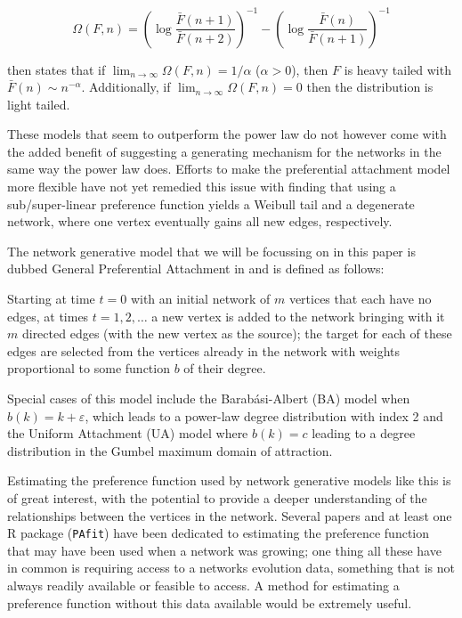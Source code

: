 \documentclass[
  sn-basic,
]{sn-jnl}
\theoremstyle{plain}
\theoremstyle{remark}
\begin{document}
\[
\Omega(F,n) = \left(\log\displaystyle\frac{\bar F (n+1)}{\bar F (n+2)}\right)^{-1} - \left(\log\displaystyle\frac{\bar F (n)}{\bar F (n+1)}\right)^{-1}
\]

\citep{shimura12} then states that if
\(\lim_{n\rightarrow\infty} \Omega(F,n) = 1/\alpha\) (\(\alpha>0\)),
then \(F\) is heavy tailed with \(\bar F(n) \sim n^{-\alpha}\).
Additionally, if \(\lim_{n\rightarrow\infty} \Omega(F,n) = 0\) then the
distribution is light tailed.

These models that seem to outperform the power law do not however come
with the added benefit of suggesting a generating mechanism for the
networks in the same way the power law does. Efforts to make the
preferential attachment model more flexible have not yet remedied this
issue with \citep{krapivsky01} finding that using a sub/super-linear
preference function yields a Weibull tail and a degenerate network,
where one vertex eventually gains all new edges, respectively.

The network generative model that we will be focussing on in this paper
is dubbed General Preferential Attachment in \citep{rudas07} and is
defined as follows:

Starting at time \(t=0\) with an initial network of \(m\) vertices that
each have no edges, at times \(t=1,2,\ldots\) a new vertex is added to
the network bringing with it \(m\) directed edges (with the new vertex
as the source); the target for each of these edges are selected from the
vertices already in the network with weights proportional to some
function \(b\) of their degree.

Special cases of this model include the Barabási-Albert (BA) model when
\(b(k) = k+\varepsilon\), which leads to a power-law degree distribution
with index 2 and the Uniform Attachment (UA) model where \(b(k)=c\)
leading to a degree distribution in the Gumbel maximum domain of
attraction.

Estimating the preference function used by network generative models
like this is of great interest, with the potential to provide a deeper
understanding of the relationships between the vertices in the network.
Several papers and at least one R package (\texttt{PAfit}) have been
dedicated to estimating the preference function that may have been used
when a network was growing; one thing all these have in common is
requiring access to a networks evolution data, something that is not
always readily available or feasible to access. A method for estimating
a preference function without this data available would be extremely
useful.
\end{document}
